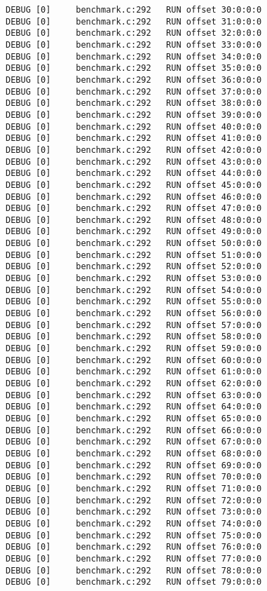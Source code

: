 \begin{verbatim}
DEBUG [0]     benchmark.c:292   RUN offset 30:0:0:0
DEBUG [0]     benchmark.c:292   RUN offset 31:0:0:0
DEBUG [0]     benchmark.c:292   RUN offset 32:0:0:0
DEBUG [0]     benchmark.c:292   RUN offset 33:0:0:0
DEBUG [0]     benchmark.c:292   RUN offset 34:0:0:0
DEBUG [0]     benchmark.c:292   RUN offset 35:0:0:0
DEBUG [0]     benchmark.c:292   RUN offset 36:0:0:0
DEBUG [0]     benchmark.c:292   RUN offset 37:0:0:0
DEBUG [0]     benchmark.c:292   RUN offset 38:0:0:0
DEBUG [0]     benchmark.c:292   RUN offset 39:0:0:0
DEBUG [0]     benchmark.c:292   RUN offset 40:0:0:0
DEBUG [0]     benchmark.c:292   RUN offset 41:0:0:0
DEBUG [0]     benchmark.c:292   RUN offset 42:0:0:0
DEBUG [0]     benchmark.c:292   RUN offset 43:0:0:0
DEBUG [0]     benchmark.c:292   RUN offset 44:0:0:0
DEBUG [0]     benchmark.c:292   RUN offset 45:0:0:0
DEBUG [0]     benchmark.c:292   RUN offset 46:0:0:0
DEBUG [0]     benchmark.c:292   RUN offset 47:0:0:0
DEBUG [0]     benchmark.c:292   RUN offset 48:0:0:0
DEBUG [0]     benchmark.c:292   RUN offset 49:0:0:0
DEBUG [0]     benchmark.c:292   RUN offset 50:0:0:0
DEBUG [0]     benchmark.c:292   RUN offset 51:0:0:0
DEBUG [0]     benchmark.c:292   RUN offset 52:0:0:0
DEBUG [0]     benchmark.c:292   RUN offset 53:0:0:0
DEBUG [0]     benchmark.c:292   RUN offset 54:0:0:0
DEBUG [0]     benchmark.c:292   RUN offset 55:0:0:0
DEBUG [0]     benchmark.c:292   RUN offset 56:0:0:0
DEBUG [0]     benchmark.c:292   RUN offset 57:0:0:0
DEBUG [0]     benchmark.c:292   RUN offset 58:0:0:0
DEBUG [0]     benchmark.c:292   RUN offset 59:0:0:0
DEBUG [0]     benchmark.c:292   RUN offset 60:0:0:0
DEBUG [0]     benchmark.c:292   RUN offset 61:0:0:0
DEBUG [0]     benchmark.c:292   RUN offset 62:0:0:0
DEBUG [0]     benchmark.c:292   RUN offset 63:0:0:0
DEBUG [0]     benchmark.c:292   RUN offset 64:0:0:0
DEBUG [0]     benchmark.c:292   RUN offset 65:0:0:0
DEBUG [0]     benchmark.c:292   RUN offset 66:0:0:0
DEBUG [0]     benchmark.c:292   RUN offset 67:0:0:0
DEBUG [0]     benchmark.c:292   RUN offset 68:0:0:0
DEBUG [0]     benchmark.c:292   RUN offset 69:0:0:0
DEBUG [0]     benchmark.c:292   RUN offset 70:0:0:0
DEBUG [0]     benchmark.c:292   RUN offset 71:0:0:0
DEBUG [0]     benchmark.c:292   RUN offset 72:0:0:0
DEBUG [0]     benchmark.c:292   RUN offset 73:0:0:0
DEBUG [0]     benchmark.c:292   RUN offset 74:0:0:0
DEBUG [0]     benchmark.c:292   RUN offset 75:0:0:0
DEBUG [0]     benchmark.c:292   RUN offset 76:0:0:0
DEBUG [0]     benchmark.c:292   RUN offset 77:0:0:0
DEBUG [0]     benchmark.c:292   RUN offset 78:0:0:0
DEBUG [0]     benchmark.c:292   RUN offset 79:0:0:0

\end{verbatim}
